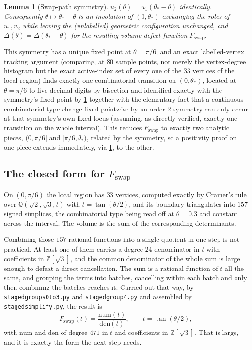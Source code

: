 \documentclass[11pt,reqno]{amsart}
\renewcommand{\_}{\origunderscore\allowbreak}
\numberwithin{equation}{section}
\theoremstyle{plain}
\newtheorem{lem}[thm]{Lemma}
\theoremstyle{definition}
\theoremstyle{remark}
\newcommand{\defect}{\Delta}                 %
\begin{document}
\begin{lem}[Swap-path symmetry]\label{lem:swapsym}
$u_2(\theta) = u_1(\theta_*-\theta)$ identically. Consequently
$\theta\mapsto\theta_*-\theta$ is an involution of $(0,\theta_*)$
exchanging the roles of $u_1,u_2$ while leaving the (unlabelled)
geometric configuration unchanged, and $\defect(\theta)=\defect(\theta_*-\theta)$
for the resulting volume-defect function $F_{\mathrm{swap}}$.
\end{lem}

This symmetry has a unique fixed point at $\theta=\pi/6$, and an exact
labelled-vertex tracking argument (comparing, at $80$ sample points, not
merely the vertex-degree histogram but the exact active-index set of
every one of the $33$ vertices of the local region) finds exactly one
combinatorial transition on $(0,\theta_*)$, located at $\theta=\pi/6$ to
five decimal digits by bisection and identified exactly with the
symmetry's fixed point by \cref{lem:swapsym} together with the
elementary fact that a continuous combinatorial-type change fixed
pointwise by an order-$2$ symmetry can only occur at that symmetry's
own fixed locus (assuming, as directly verified, exactly one transition
on the whole interval). This reduces $F_{\mathrm{swap}}$ to exactly two
analytic pieces, $(0,\pi/6]$ and $[\pi/6,\theta_*)$, related by the
symmetry, so a positivity proof on one piece extends immediately,
via \cref{lem:swapsym}, to the other.

\subsection{The closed form for \texorpdfstring{$F_{\mathrm{swap}}$}{F swap}}\label{sec:swap-obstacle}

On $(0,\pi/6)$ the local region has $33$ vertices, computed exactly by
Cramer's rule over $\mathbb{Q}(\sqrt2,\sqrt3,t)$ with
$t=\tan(\theta/2)$, and its boundary triangulates into $157$ signed
simplices, the combinatorial type being read off at $\theta=0.3$ and
constant across the interval. The volume is the sum of the
corresponding determinants.

Combining those $157$ rational functions into a single quotient in one
step is not practical. At least one of them carries a degree-$24$
denominator in $t$ with coefficients in $\mathbb{Z}[\sqrt3]$, and the
common denominator of the whole sum is large enough to defeat a direct
cancellation. The sum is a rational function of $t$ all the same, and
grouping the terms into batches, cancelling within each batch and only
then combining the batches reaches it. Carried out that way, by
\texttt{staged\_groups0to3.py} and \texttt{staged\_group4.py} and
assembled by \texttt{staged\_simplify.py}, the result is
\[
  F_{\mathrm{swap}}(t) = \frac{\mathrm{num}(t)}{\mathrm{den}(t)}, \qquad
  t=\tan(\theta/2),
\]
with $\mathrm{num}$ and $\mathrm{den}$ of degree $471$ in $t$ and
coefficients in $\mathbb{Z}[\sqrt3]$. That is large, and it is exactly
the form the next step needs.
\end{document}
